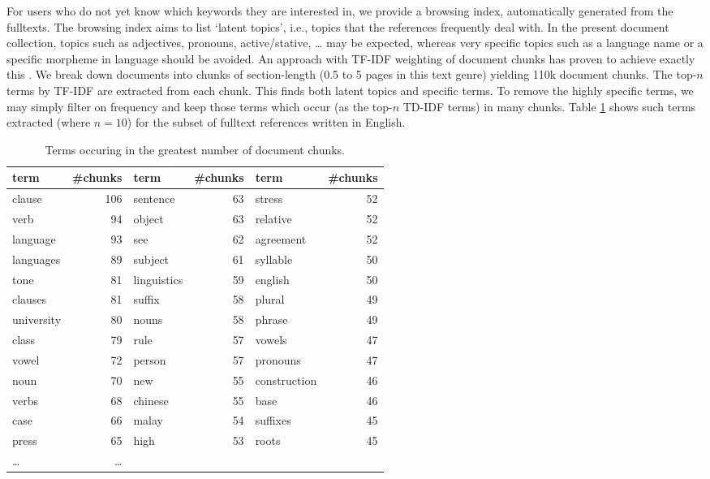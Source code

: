 \documentclass[10pt, a4paper]{article}
\begin{document}
For users who do not yet know which keywords they are interested in,
we provide a browsing index, automatically generated from the
fulltexts.  The browsing index aims to list `latent topics', i.e.,
topics that the references frequently deal with. In the present
document collection, topics such as adjectives, pronouns,
active/stative, \ldots{} may be expected, whereas very specific topics
such as a language name or a specific morpheme in language should be
avoided. An approach with TF-IDF weighting of document chunks has
proven to achieve exactly this \cite{Hammarstrom2012GSLT}. We break down
documents into chunks of section-length (0.5 to 5 pages in this text
genre) yielding 110k document chunks. The top-$n$ terms by TF-IDF are
extracted from each chunk. This finds both latent topics and specific
terms. To remove the highly specific terms, we may simply filter on
frequency and keep those terms which occur (as the top-$n$ TD-IDF
terms) in many chunks. Table \ref{tab:tfidfterms} shows such terms
extracted (where $n=10$) for the subset of fulltext references written
in English.

   
\begin{table}
  \begin{tabular}{p{.8cm}rp{.8cm}rp{.8cm}r}
  term & \#chunks & term & \#chunks & term & \#chunks \\
  \hline
  clause & 106 & sentence & 63 & stress & 52\\
  verb & 94 & object & 63 & relative & 52\\
  language & 93 & see & 62 & agreement & 52\\
  languages & 89 & subject & 61 & syllable & 50\\
  tone & 81 & linguistics & 59 & english & 50\\
  clauses & 81 & suffix & 58 & plural & 49\\
  university & 80 & nouns & 58 & phrase & 49\\
  class & 79 & rule & 57 & vowels & 47\\
  vowel & 72 & person & 57 & pronouns & 47\\
  noun & 70 & new & 55 & construction & 46\\
  verbs & 68 & chinese & 55 & base & 46\\
  case & 66 & malay & 54 & suffixes & 45\\
  press & 65 & high & 53 & roots & 45\\
  \ldots{} & \ldots{}
  \end{tabular}
\caption{Terms occuring in the greatest number of document chunks.}
\label{tab:tfidfterms}
\end{table}
\end{document}
